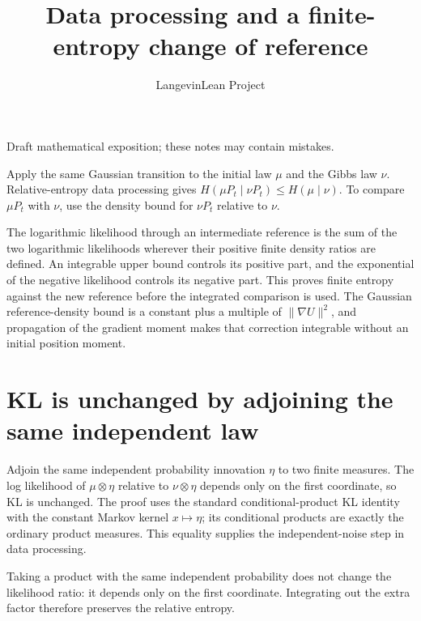 \documentclass[11pt,a4paper]{article}
\title{\texorpdfstring{Data processing and a finite-entropy change of reference}{Data processing and a finite-entropy change of reference}}
\author{LangevinLean Project}
\date{}
\begin{document}
\maketitle
Draft mathematical exposition; these notes may contain mistakes.


Apply the same Gaussian transition to the initial law \(\mu\) and the Gibbs law \(\nu\). Relative-entropy data processing gives \(H(\mu P_t\mid\nu P_t)\le H(\mu\mid\nu)\). To compare \(\mu P_t\) with \(\nu\), use the density bound for \(\nu P_t\) relative to \(\nu\).



The logarithmic likelihood through an intermediate reference is the sum of the two logarithmic likelihoods wherever their positive finite density ratios are defined. An integrable upper bound controls its positive part, and the exponential of the negative likelihood controls its negative part. This proves finite entropy against the new reference before the integrated comparison is used. The Gaussian reference-density bound is a constant plus a multiple of \(\|\nabla U\|^2\), and propagation of the gradient moment makes that correction integrable without an initial position moment.


\section{\texorpdfstring{KL is unchanged by adjoining the same independent law}{KL is unchanged by adjoining the same independent law}}


Adjoin the same independent probability innovation \(\eta\) to two finite measures. The log likelihood of \(\mu\otimes\eta\) relative to \(\nu\otimes\eta\) depends only on the first coordinate, so KL is unchanged. The proof uses the standard conditional-product KL identity with the constant Markov kernel \(x\mapsto\eta\); its conditional products are exactly the ordinary product measures. This equality supplies the independent-noise step in data processing.



Taking a product with the same independent probability does not change the likelihood ratio: it depends only on the first coordinate. Integrating out the extra factor therefore preserves the relative entropy.
\end{document}

